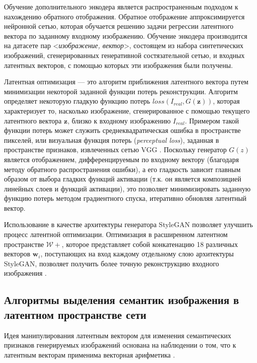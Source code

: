 Обучение дополнительного энкодера \cite{donahue2016adversarial} является распространенным подходом к нахождению обратного отображения.
Обратное отображение аппроксимируется нейронной сетью, которая обучается решению задачи регрессии латентного вектора по заданному входному изображению. 
Обучение энкодера производится на датасете пар <\emph{изображение, вектор}>, состоящем из набора синтетических изображений, сгенерированных генеративной состязательной сетью, и входных латентных векторов, с помощью которых эти изображения были получены.

Латентная оптимизация \cite{perarnau2016invertible} --- это алгоритм приближения латентного вектора путем минимизации некоторой заданной функции потерь реконструкции.
Алгоритм определяет некоторую гладкую функцию потерь $loss(I_{real}, G(\mathbf z)) $, которая характеризует то, насколько изображение, сгенерированное с помощью текущего латентного вектора $\mathbf z$, близко к входному изображению $I_{real}$.
Примером такой функции потерь может служить среднеквадратическая ошибка в пространстве пикселей, или визуальная функция потерь (\emph{perceptual loss}), заданная в пространстве признаков, извлеченных сетью VGG \cite{Johnson2016Perceptual}.
Поскольку генератор $G(z)$ является отображением, дифференцируемым по входному вектору (благодаря методу обратного распространения ошибки), а его гладкость зависит главным образом от выбора гладких функций активации (т.к. он является композицией линейных слоев и функций активации), это позволяет минимизировать заданную функцию потерь методом градиентного спуска, итеративно обновляя латентный вектор.

Использование в качестве архитектуры генератора StyleGAN позволяет улучшить процесс латентной оптимизации.
Оптимизация в расширенном латентном пространстве $\mathcal W+$, которое представляет собой конкатенацию 18 различных векторов $\mathbf w_i$, поступающих на вход каждому отдельному слою архитектуры StyleGAN, позволяет получить более точную реконструкцию входного изображения \cite{abdal2019image2stylegan}.


\subsection{Алгоритмы выделения семантик изображения в латентном пространстве сети}

Идея манипулирования латентным вектором для изменения семантических признаков генерируемых изображений основана на наблюдении о том, что к латентным векторам применима векторная арифметика \cite{radford2015unsupervised}.

